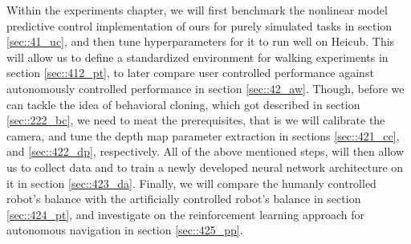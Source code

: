 Within the experiments chapter, we will first benchmark the nonlinear model predictive control implementation of ours for purely simulated tasks in section \ref{sec::41_uc}, and then tune hyperparameters for it to run well on Heicub. This will allow us to define a standardized environment for walking experiments in section \ref{sec::412_pt}, to later compare user controlled performance against autonomously controlled performance in section \ref{sec::42_aw}. Though, before we can tackle the idea of behavioral cloning, which got described in section \ref{sec::222_bc}, we need to meat the prerequisites, that is we will calibrate the camera, and tune the depth map parameter extraction in sections \ref{sec::421_cc}, and \ref{sec::422_dp}, respectively. All of the above mentioned steps, will then allow us to collect data and to train a newly developed neural network architecture on it in section \ref{sec::423_da}. Finally, we will compare the humanly controlled robot's balance with the artificially controlled robot's balance in section \ref{sec::424_pt}, and investigate on the reinforcement learning approach for autonomous navigation in section \ref{sec::425_pp}.
